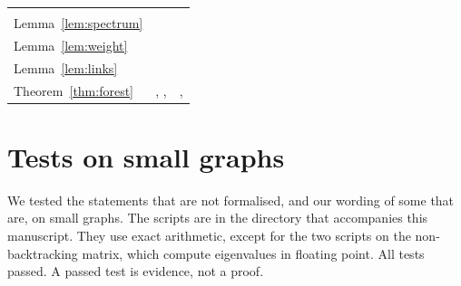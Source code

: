 \documentclass[11pt]{article}
\theoremstyle{definition}
\theoremstyle{remark}
\numberwithin{equation}{section}
\begin{document}
\begin{center}
\begin{tabular}{@{}L{3.7cm}L{6.3cm}L{5.6cm}@{}}
   \\
Lemma~\ref{lem:spectrum} &  &
   \\
Lemma~\ref{lem:weight} &  &
   \\
Lemma~\ref{lem:links} &  &  \\
Theorem~\ref{thm:forest} & , ,
   & ,
   \\
\bottomrule
\end{tabular}
\label{tab:steps}
\end{center}

\section{Tests on small graphs}\label{app:checks}

We tested the statements that are not formalised, and our wording of some that are, on small graphs.
The scripts are in the directory  that accompanies this manuscript. They use
exact arithmetic, except for the two scripts on the non-backtracking matrix, which compute
eigenvalues in floating point. All tests passed. A passed test is evidence, not a proof.
\end{document}

